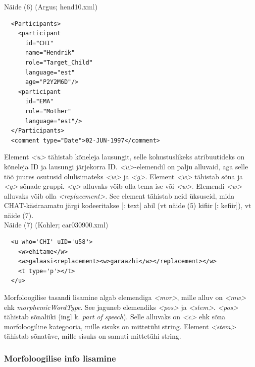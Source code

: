 \documentclass[12pt]{article}
\begin{document}
Näide (6) (Argus; hend10.xml)
\begin{lstlisting}
  <Participants>
    <participant
      id="CHI"
      name="Hendrik"
      role="Target_Child"
      language="est"
      age="P2Y2M6D"/>
    <participant
      id="EMA"
      role="Mother"
      language="est"/>
  </Participants>
  <comment type="Date">02-JUN-1997</comment>
\end{lstlisting}

Element \emph{<u>} tähistab kõneleja lausungit, selle kohustuslikeks atribuutideks on kõneleja ID ja lausungi järjekorra ID. \emph{<u>}-elemendil on palju alluvaid, aga selle töö juures osutusid olulisimateks \emph{<w>} ja \emph{<g>}. Element \emph{<w>} tähistab sõna ja \emph{<g>} sõnade gruppi. \emph{<g>} alluvaks võib olla tema ise või \emph{<w>}. Elemendi \emph{<w>} alluvaks võib olla \emph{<replacement>}. See element tähistab neid üksuseid, mida CHAT-käsiraamatu järgi kodeeritakse [: text] abil (vt näide (5) kifiir [: kefiir]), vt näide (7).\\

Näide (7) (Kohler; car030900.xml)
\begin{lstlisting}
  <u who='CHI' uID='u58'>
    <w>ehitame</w>
    <w>galaasi<replacement><w>garaazhi</w></replacement></w>
    <t type='p'></t>
  </u>
\end{lstlisting}

Morfoloogilise tasandi lisamine algab elemendiga \emph{<mor>}, mille alluv on \emph{<mw>} ehk \emph{morphemicWordType}. See jaguneb elemendiks \emph{<pos>} ja \emph{<stem>}. \emph{<pos>} tähistab sõnaliiki (ingl k. \emph{part of speech}). Selle alluvaks on \emph{<c>} ehk sõna morfoloogiline kategooria, mille sisuks on mittetühi string. Element \emph{<stem>} tähistab sõnatüve, mille sisuks on samuti mittetühi string.

\subsubsection{Morfoloogilise info lisamine}
\end{document}
